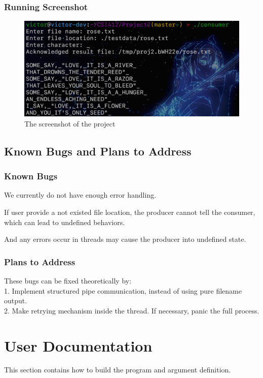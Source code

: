 \documentclass{article}
\begin{document}
\subsubsection{Running Screenshot}

\begin{figure}[H]
    \centering
    \includegraphics[width=15cm, screenshot]{img/project2_run_result.png}
    \caption{The screenshot of the project}
\end{figure}

\subsection{Known Bugs and Plans to Address}
\subsubsection{Known Bugs}
We currently do not have enough error handling. 

If user provide a not existed file location, the producer cannot tell the consumer, which can lead to undefined behaviors.

And any errors occur in threads may cause the producer into undefined state.

\subsubsection{Plans to Address}
These bugs can be fixed theoretically by: \\
1. Implement structured pipe communication, instead of using pure filename output. \\
2. Make retrying mechanism inside the thread. If necessary, panic the full process.\\

\section{User Documentation}
This section contains how to build the program and argument definition.
\end{document}
